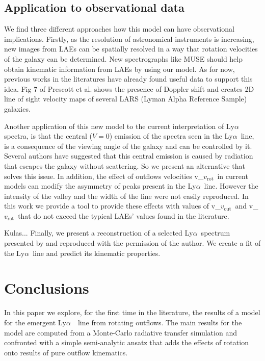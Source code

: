\documentclass[a4paper,fleqn,usenatbib]{mnras}
\newcommand{\lya}{\ifmmode{{\rm Ly}\alpha}\else Ly$\alpha$\ \fi}
\newcommand{\vrot}{\ifmmode v_{\mathrm{rot}}\else $v_{\mathrm{rot}}$~\fi}
\newcommand{\vout}{\ifmmode v_{\mathrm{out}}\else $v_{\mathrm{out}}$~\fi}
\begin{document}
\subsection{Application to observational data}

We find three different approaches how this model can have observational
implications. Firstly, as the resolution of astronomical instruments is
increasing, new images from LAEs can be spatially resolved in a way that
rotation velocities of the galaxy can be determined. New spectrographs like
MUSE should help obtain kinematic information from LAEs by using our model.
As for now, previous works in the literatures have already found useful data
to support this idea. Fig 7 of Prescott et al. \cite{Prescott14} shows the
presence of Doppler shift and \cite{Herenz2016} creates 2D line of sight
velocity maps of several LARS (Lyman Alpha Reference Sample) galaxies.

Another application of this new model to the current interpretation of \lya
spectra, is that the central ($V=0$) emission of the spectra seen in the
\lya line, is a consequence of the viewing angle of the galaxy and can be
controlled by it. Several authors have suggested that this central emission
is caused by radiation that escapes the galaxy without scattering. So we
present an alternative that solves this issue. In addition, the effect of
outflows velocities \vrot in current models can modify the asymmetry of peaks
present in the \lya line. However the intensity of the valley and the width
of the line were not easily reproduced. In this work we provide a tool to
provide these effects with values of \vout and \vrot that do not exceed the
typical LAEs' values found in the literature.

\color{red}
Kulas...
\color{black}
Finally, we present a reconstruction of a selected \lya spectrum presented
by \cite{Kulas12} and reproduced with the permission of the author. We create
a fit of the \lya line and predict its kinematic properties.

\section{Conclusions}
\label{sec:conclusions}

In this paper we explore, for the first time in the literature,
the results of a model for the emergent \lya\ line from rotating outflows.
The main results for the model are computed from a Monte-Carlo radiative transfer
simulation and confronted with a simple semi-analytic ansatz that adds the effects
of rotation onto results of pure outflow kinematics.
\end{document}
